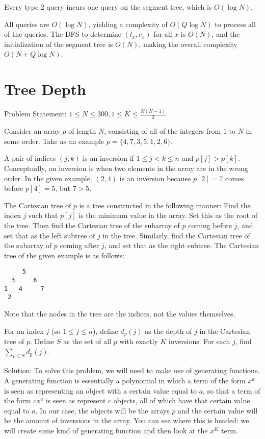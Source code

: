\documentclass{article}
\begin{document}
Every type 2 query incurs one query on the segment tree, which is $O(\log N)$.

All queries are $O(\log N)$, yielding a complexity of $O(Q\log N)$ to process all of the queries. The DFS to determine $(l_x, r_x)$ for all $x$ is $O(N)$, and the initialization of the segment tree is $O(N)$, making the overall complexity $O(N + Q\log N)$.


\section{Tree Depth}

Problem Statement: $1 \leq N \leq 300, 1 \leq K \leq \frac {N(N - 1)} 2$

Consider an array $p$ of length $N$, consisting of all of the integers from $1$ to $N$ in some order. Take as an example $p = \{4, 7, 3, 5, 1, 2, 6\}$.

A pair of indices $(j, k)$ is an inversion if $1 \leq j < k \leq n$ and $p[j] > p[k]$. Conceptually, an inversion is when two elements in the array are in the wrong order. In the given example, $(2 ,4)$ is an inversion because $p[2] = 7$ comes before $p[4] = 5$, but $7 > 5$.

The Cartesian tree of $p$ is a tree constructed in the following manner: Find the index $j$ such that $p[j]$ is the minimum value in the array. Set this as the root of the tree. Then find the Cartesian tree of the subarray of $p$ coming before $j$, and set that as the left subtree of $j$ in the tree. Similarly, find the Cartesian tree of the subarray of $p$ coming after $j$, and set that as the right subtree. The Cartesian tree of the given example is as follows:
\begin{verbatim}
     5  
  3     6 
1   4     7
 2
\end{verbatim}

Note that the nodes in the tree are the indices, not the values themselves.

For an index $j$ (so $1 \leq j \leq n$), define $d_p(j)$ as the depth of $j$ in the Cartesian tree of $p$. Define $S$ as the set of all $p$ with exactly $K$ inversions. For each $j$, find $\sum_{p\in S} d_p(j)$.

Solution: To solve this problem, we will need to make use of generating functions. A generating function is essentially a polynomial in which a term of the form $x^a$ is seen as representing an object with a certain value equal to $a$, so that a term of the form $cx^a$ is seen as represent $c$ objects, all of which have that certain value equal to $a$. In our case, the objects will be the arrays $p$ and the certain value will be the amount of inversions in the array. You can see where this is headed: we will create some kind of generating function and then look at the $x^K$ term.
\end{document}
